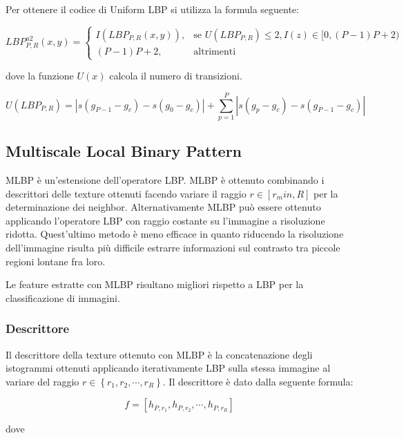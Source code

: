 Per ottenere il codice di Uniform \acs{LBP} si utilizza la formula seguente:

\begin{equation}
LBP_{P,R}^{u2}(x, y)=	
\begin{cases} 
I(LBP_{P,R}(x, y)), & \mbox{se } U(LBP_{P,R}) \le 2, I(z) \in [0, (P-1)P+2 )   \\
(P-1)P+2, & \mbox{altrimenti}
\end{cases}
\end{equation}

dove la funzione $U(x)$ calcola il numero di transizioni.

\begin{equation}
U(LBP_{P,R}) = |s( g_{P-1} - g_{c}) - s(g_{0} - g_{c}) | + \sum_{p = 1}^{P} |s(g_{p} - g_{c}) - s( g_{P-1} - g_{c}) |
\end{equation}

\subsection{Multiscale Local Binary Pattern}
\acf{MLBP} è un'estensione dell'operatore \acs{LBP}. \acs{MLBP} è ottenuto combinando i descrittori delle texture ottenuti facendo variare il raggio $r \in [r_min, R]$ per la determinazione dei neighbor. 
Alternativamente \acs{MLBP} può essere ottenuto applicando l'operatore \acs{LBP} con raggio costante su l'immagine a risoluzione ridotta. Quest'ultimo metodo è meno efficace in quanto riducendo la risoluzione dell'immagine risulta più difficile estrarre informazioni sul contrasto tra piccole regioni lontane fra loro.

Le feature estratte con \acs{MLBP} risultano migliori rispetto a \acs{LBP} per la classificazione di immagini.

\subsubsection{Descrittore}
Il descrittore della texture ottenuto con \acs{MLBP} è la concatenazione degli istogrammi ottenuti applicando iterativamente \acs{LBP} sulla stessa immagine al variare del raggio $r \in \left\lbrace  r_1, r_2, \cdots, r_R \right\rbrace$. Il descrittore è dato dalla seguente formula:

\begin{equation}
f = [h_{P, r_{1}}, h_{P, r_{2}}, \cdots, h_{P, r_R}]
\end{equation}

\noindent dove

